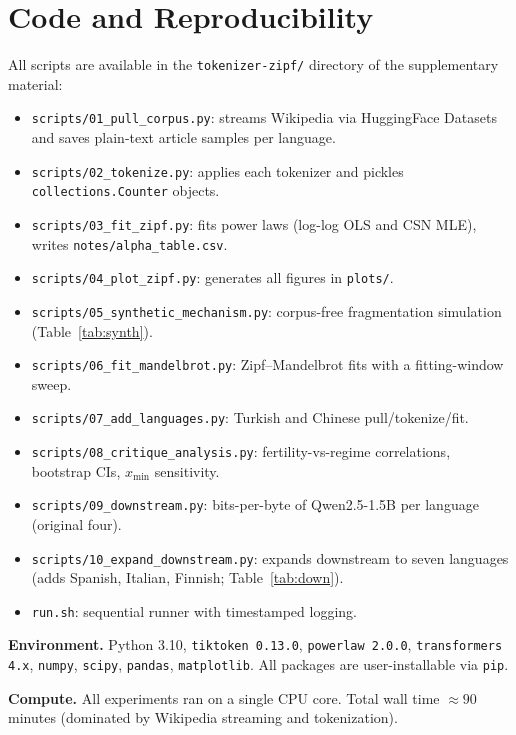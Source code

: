 \documentclass{article}
\begin{document}
\section{Code and Reproducibility}
\label{app:code}

All scripts are available in the \texttt{tokenizer-zipf/} directory of the supplementary
material:

\begin{itemize}
  \item \texttt{scripts/01\_pull\_corpus.py}: streams Wikipedia via HuggingFace Datasets
    and saves plain-text article samples per language.
  \item \texttt{scripts/02\_tokenize.py}: applies each tokenizer and pickles
    \texttt{collections.Counter} objects.
  \item \texttt{scripts/03\_fit\_zipf.py}: fits power laws (log-log OLS and CSN MLE),
    writes \texttt{notes/alpha\_table.csv}.
  \item \texttt{scripts/04\_plot\_zipf.py}: generates all figures in \texttt{plots/}.
  \item \texttt{scripts/05\_synthetic\_mechanism.py}: corpus-free fragmentation simulation (Table~\ref{tab:synth}).
  \item \texttt{scripts/06\_fit\_mandelbrot.py}: Zipf--Mandelbrot fits with a fitting-window sweep.
  \item \texttt{scripts/07\_add\_languages.py}: Turkish and Chinese pull/tokenize/fit.
  \item \texttt{scripts/08\_critique\_analysis.py}: fertility-vs-regime correlations, bootstrap CIs, $x_{\min}$ sensitivity.
  \item \texttt{scripts/09\_downstream.py}: bits-per-byte of Qwen2.5-1.5B per language (original four).
  \item \texttt{scripts/10\_expand\_downstream.py}: expands downstream to seven languages (adds Spanish, Italian, Finnish; Table~\ref{tab:down}).
  \item \texttt{run.sh}: sequential runner with timestamped logging.
\end{itemize}

\textbf{Environment.} Python 3.10, \texttt{tiktoken 0.13.0}, \texttt{powerlaw 2.0.0},
\texttt{transformers 4.x}, \texttt{numpy}, \texttt{scipy}, \texttt{pandas},
\texttt{matplotlib}. All packages are user-installable via \texttt{pip}.

\textbf{Compute.} All experiments ran on a single CPU core. Total wall time $\approx 90$
minutes (dominated by Wikipedia streaming and tokenization).
\end{document}

